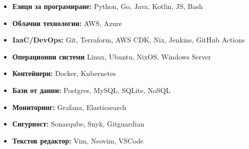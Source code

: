 \begin{itemize}[leftmargin=1.2em, itemsep=2pt]
	\item \textbf{Езици за програмиране:} Python, Go, Java, Kotlin, JS, Bash
	\item \textbf{Облачни технологии:} AWS, Azure
	\item \textbf{IaaC/DevOps:} Git, Terraform, AWS CDK, Nix, Jenkins, GitHub Actions
	\item \textbf{Операционни системи} Linux, Ubuntu, NixOS, Windows Server
	\item \textbf{Контейнери:} Docker, Kubernetes
	\item \textbf{Бази от данни:} Postgres, MySQL, SQLite, NoSQL
	\item \textbf{Мониторинг:} Grafana, Elasticsearch
	\item \textbf{Сигурност:} Sonarqube, Snyk, Gitguardian
	\item \textbf{Текстов редактор:} Vim, Neovim, VSCode
\end{itemize}
